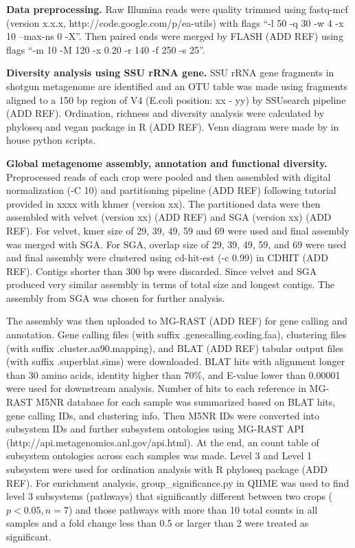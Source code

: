 \documentclass[12pt]{article}
\begin{document}
{\bf Data preprocessing.}
Raw Illumina reads were quality trimmed using fastq-mcf (version x.x.x, http://code.google.com/p/ea-utils) with flags ``-l 50 -q 30 -w 4 -x 10 --max-ns 0 -X''. Then paired ends were merged by FLASH (ADD REF) using flags ``-m 10 -M 120 -x 0.20 -r 140 -f 250 -s 25''.

{\bf Diversity analysis using SSU rRNA gene.}
SSU rRNA gene fragments in shotgun metagenome are identified and an OTU table was made using fragments aligned to a 150 bp region of V4 (E.coli position: xx - yy) by SSUsearch pipeline (ADD REF). Ordination, richness and diversity analysis were calculated by phyloseq and vegan package in R (ADD REF). Venn diagram were made by in house python scripts.

{\bf Global metagenome assembly, annotation and functional diversity.}
Preprocessed reads of each crop were pooled and then assembled with digital normalization (-C 10) and partitioning pipeline (ADD REF) following tutorial provided in xxxx with khmer (version xx). The partitioned data were then assembled with velvet (version xx) (ADD REF) and SGA (version xx) (ADD REF). For velvet, kmer size of 29, 39, 49, 59 and 69 were used and final assembly was merged with SGA. For SGA, overlap size of 29, 39, 49, 59, and 69 were used and final assembly were clustered using cd-hit-est (-c 0.99) in CDHIT (ADD REF). Contigs shorter than 300 bp were discarded. Since velvet and SGA produced very similar assembly in terms of total size and longest contigs. The assembly from SGA was chosen for further analysis.

The assembly was then uploaded to MG-RAST (ADD REF) for gene calling and annotation. Gene calling files (with suffix .genecalling.coding.faa), clustering files (with suffix .cluster.aa90.mapping), and BLAT (ADD REF) tabular output files (with suffix .superblat.sims) were downloaded. BLAT hits with alignment longer than 30 amino acids, identity higher than 70\%, and E-value lower than 0.00001 were used for downstream analysis. Number of hits to each reference in MG-RAST M5NR database for each sample was summarized based on BLAT hits, gene calling IDs, and clustering info. Then M5NR IDs were converted into subsystem IDs and further subsystem ontologies using MG-RAST API (http://api.metagenomics.anl.gov/api.html). At the end, an count table of subsystem ontologies across each samples was made. Level 3 and Level 1 subsystem were used for ordination analysis with R phyloseq package (ADD REF). For enrichment analysis, group\_significance.py in QIIME was used to find level 3 subsystems (pathways) that significantly different between two crops ($p < 0.05, n = 7$) and those pathways with more than 10 total counts in all samples and a fold change less than 0.5 or larger than 2 were treated as significant.
\end{document}

